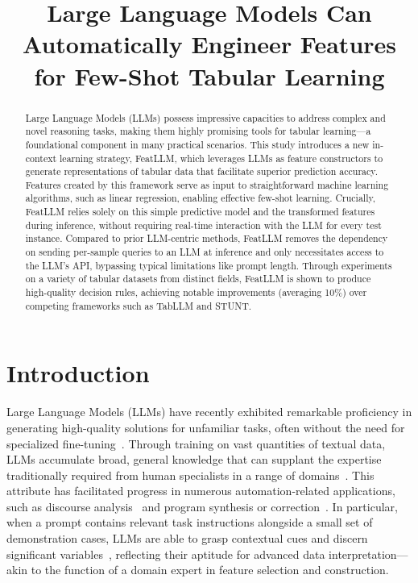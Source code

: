 \title{Large Language Models Can Automatically Engineer Features for Few-Shot Tabular Learning}

\begin{abstract}
Large Language Models (LLMs) possess impressive capacities to address complex and novel reasoning tasks, making them highly promising tools for tabular learning—a foundational component in many practical scenarios. This study introduces a new in-context learning strategy, \textsf{FeatLLM}, which leverages LLMs as feature constructors to generate representations of tabular data that facilitate superior prediction accuracy. Features created by this framework serve as input to straightforward machine learning algorithms, such as linear regression, enabling effective few-shot learning. Crucially, \textsf{FeatLLM} relies solely on this simple predictive model and the transformed features during inference, without requiring real-time interaction with the LLM for every test instance. Compared to prior LLM-centric methods, \textsf{FeatLLM} removes the dependency on sending per-sample queries to an LLM at inference and only necessitates access to the LLM’s API, bypassing typical limitations like prompt length. Through experiments on a variety of tabular datasets from distinct fields, \textsf{FeatLLM} is shown to produce high-quality decision rules, achieving notable improvements (averaging 10\%) over competing frameworks such as TabLLM and STUNT.
\end{abstract}

\section{Introduction}
Large Language Models (LLMs) have recently exhibited remarkable proficiency in generating high-quality solutions for unfamiliar tasks, often without the need for specialized fine-tuning~\cite{creswell2022selection,imani2023mathprompter,taylor2022galactica}. Through training on vast quantities of textual data, LLMs accumulate broad, general knowledge that can supplant the expertise traditionally required from human specialists in a range of domains~\cite{Genomes2021,singhal2023large,wilcox2003role}. This attribute has facilitated progress in numerous automation-related applications, such as discourse analysis~\cite{finch2023leveraging} and program synthesis or correction~\cite{fan2023automated}. In particular, when a prompt contains relevant task instructions alongside a small set of demonstration cases, LLMs are able to grasp contextual cues and discern significant variables~\cite{brown2020language,zhao2023survey}, reflecting their aptitude for advanced data interpretation—akin to the function of a domain expert in feature selection and construction.

